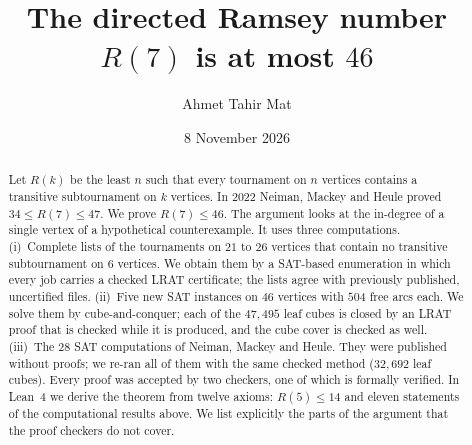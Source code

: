 \documentclass[11pt]{amsart}
\theoremstyle{definition}
\theoremstyle{remark}
\begin{document}
\title{The directed Ramsey number $R(7)$ is at most $46$}

\author{Ahmet Tahir Mat}
\address{Papex Labs}

\date{8 November 2026}


\begin{abstract}
Let $R(k)$ be the least $n$ such that every tournament on $n$ vertices
contains a transitive subtournament on $k$ vertices. In 2022 Neiman, Mackey
and Heule proved $34 \le R(7) \le 47$. We prove $R(7) \le 46$. The argument
looks at the in-degree of a single vertex of a hypothetical counterexample.
It uses three computations. (i)~Complete lists of the tournaments on $21$ to
$26$ vertices that contain no transitive subtournament on $6$ vertices. We
obtain them by a SAT-based enumeration in which every job carries a checked
LRAT certificate; the lists agree with previously published, uncertified
files. (ii)~Five new SAT instances on $46$ vertices with $504$ free arcs each.
We solve them by cube-and-conquer; each of the $47{,}495$ leaf cubes is closed
by an LRAT proof that is checked while it is produced, and the cube cover is
checked as well. (iii)~The $28$ SAT computations of Neiman, Mackey and Heule.
They were published without proofs; we re-ran all of them with the same
checked method ($32{,}692$ leaf cubes). Every proof was accepted by two
checkers, one of which is formally verified. In Lean~4 we derive the theorem
from twelve axioms: $R(5) \le 14$ and eleven statements of the computational
results above. We list explicitly the parts of the argument that the proof
checkers do not cover.
\end{abstract}

\maketitle

\end{document}
